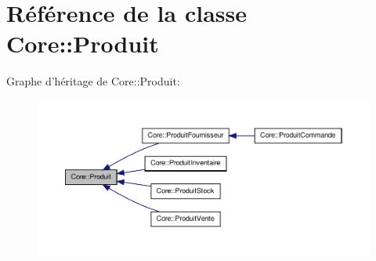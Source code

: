 \hypertarget{class_core_1_1_produit}{
\section{Référence de la classe Core::Produit}
\label{d3/d87/class_core_1_1_produit}
}


Graphe d'héritage de Core::Produit:\nopagebreak
\begin{figure}[H]
\begin{center}
\leavevmode
\includegraphics[width=400pt]{d3/dec/class_core_1_1_produit__inherit__graph}
\end{center}
\end{figure}
